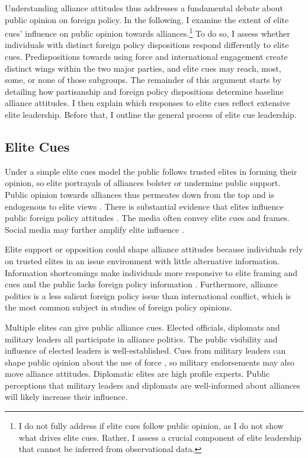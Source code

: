 \documentclass[12pt]{article}
\begin{document}
Understanding alliance attitudes thus addresses a fundamental debate about public opinion on foreign policy. 
In the following, I examine the extent of elite cues' influence on public opinion towards alliances.\footnote{I do not fully address if elite cues follow public opinion, as I do not show what drives elite cues. Rather, I assess a crucial component of elite leadership that cannot be inferred from observational data.}
To do so, I assess whether individuals with distinct foreign policy dispositions respond differently to elite cues.
Predispositions towards using force and international engagement create distinct wings within the two major parties, and elite cues may reach, most, some, or none of those subgroups.
The remainder of this argument starts by detailing how partisanship and foreign policy dispositions determine baseline alliance attitudes.
I then explain which responses to elite cues reflect extensive elite leadership. 
Before that, I outline the general process of elite cue leadership. 


\subsection{Elite Cues} 


Under a simple elite cues model the public follows trusted elites in forming their opinion, so elite portrayals of alliances bolster or undermine public support.
Public opinion towards alliances thus permeates down from the top and is endogenous to elite views \citep{Druckman2014}.
There is substantial evidence that elites influence public foreign policy attitudes \citep{BaumPotter2008}. 
The media often convey elite cues and frames.
Social media may further amplify elite influence \citep{BaumPotter2019}.   


Elite support or opposition could shape alliance attitudes because individuals rely on trusted elites in an issue environment with little alternative information. 
Information shortcomings make individuals more responsive to elite framing and cues \citep{Druckman2001, Peterson2017} and the public lacks foreign policy information \citep{BaumPotter2008}.
Furthermore, alliance politics is a less salient foreign policy issue than international conflict, which is the most common subject in studies of foreign policy opinions. 


Multiple elites can give public alliance cues.
Elected officials, diplomats and military leaders all participate in alliance politics.
The public visibility and influence of elected leaders is well-established.  
Cues from military leaders can shape public opinion about the use of force \citep{Golbyetal2018}, so military endorsements may also move alliance attitudes. 
Diplomatic elites are high profile experts. 
Public perceptions that military leaders and diplomats are well-informed about alliances will likely increase their influence. 
\end{document}
